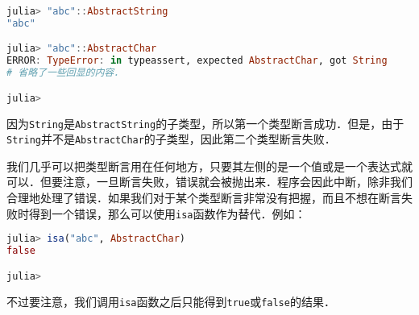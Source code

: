 \begin{lstlisting}[language=julia]
julia> "abc"::AbstractString
"abc"

julia> "abc"::AbstractChar
ERROR: TypeError: in typeassert, expected AbstractChar, got String
# 省略了一些回显的内容．

julia> 
\end{lstlisting}

因为\verb|String|是\verb|AbstractString|的子类型，所以第一个类型断言成功．但是，由于\verb|String|并不是\verb|AbstractChar|的子类型，因此第二个类型断言失败．

我们几乎可以把类型断言用在任何地方，只要其左侧的是一个值或是一个表达式就可以．但要注意，一旦断言失败，错误就会被抛出来．程序会因此中断，除非我们合理地处理了错误．如果我们对于某个类型断言非常没有把握，而且不想在断言失败时得到一个错误，那么可以使用\verb|isa|函数作为替代．例如：

\begin{lstlisting}[language=julia]
julia> isa("abc", AbstractChar)
false

julia> 
\end{lstlisting}

不过要注意，我们调用\verb|isa|函数之后只能得到\verb|true|或\verb|false|的结果．